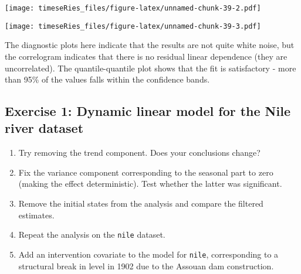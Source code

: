 \documentclass[]{book}
\newenvironment{Shaded}{\begin{snugshade}}{\end{snugshade}}
\newcommand{\CommentTok}[1]{\textcolor[rgb]{0.56,0.35,0.01}{\textit{#1}}}
\newcommand{\ControlFlowTok}[1]{\textcolor[rgb]{0.13,0.29,0.53}{\textbf{#1}}}
\newcommand{\DataTypeTok}[1]{\textcolor[rgb]{0.13,0.29,0.53}{#1}}
\newcommand{\DecValTok}[1]{\textcolor[rgb]{0.00,0.00,0.81}{#1}}
\newcommand{\FloatTok}[1]{\textcolor[rgb]{0.00,0.00,0.81}{#1}}
\newcommand{\KeywordTok}[1]{\textcolor[rgb]{0.13,0.29,0.53}{\textbf{#1}}}
\newcommand{\NormalTok}[1]{#1}
\newcommand{\OperatorTok}[1]{\textcolor[rgb]{0.81,0.36,0.00}{\textbf{#1}}}
\newcommand{\StringTok}[1]{\textcolor[rgb]{0.31,0.60,0.02}{#1}}
\providecommand{\tightlist}{%
  \setlength{\itemsep}{0pt}\setlength{\parskip}{0pt}}
\begin{document}
\texttt{[image: timeseRies\_files/figure-latex/unnamed-chunk-39-2.pdf]}

\begin{Shaded}
\end{Shaded}

\texttt{[image: timeseRies\_files/figure-latex/unnamed-chunk-39-3.pdf]}

The diagnostic plots here indicate that the results are not quite white
noise, but the correlogram indicates that there is no residual linear
dependence (they are uncorrelated). The quantile-quantile plot shows
that the fit is satisfactory - more than 95\% of the values falls within
the confidence bands.

\hypertarget{exercise-1-dynamic-linear-model-for-the-nile-river-dataset}{%
\subsection{Exercise 1: Dynamic linear model for the Nile river
dataset}\label{exercise-1-dynamic-linear-model-for-the-nile-river-dataset}}

\begin{enumerate}
\def\labelenumi{\arabic{enumi}.}
\tightlist
\item
  Try removing the trend component. Does your conclusions change?
\item
  Fix the variance component corresponding to the seasonal part to zero
  (making the effect deterministic). Test whether the latter was
  significant.
\item
  Remove the initial states from the analysis and compare the filtered
  estimates.
\item
  Repeat the analysis on the \texttt{nile} dataset.
\item
  Add an intervention covariate to the model for \texttt{nile},
  corresponding to a structural break in level in 1902 due to the
  Assouan dam construction.
\end{enumerate}
\end{document}
